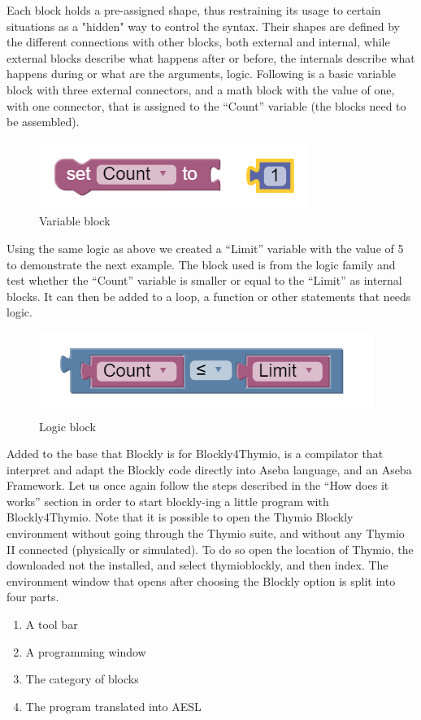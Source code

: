 \documentclass{scrartcl}
\begin{document}
Each block holds a pre-assigned shape, thus restraining its usage to certain situations as a "hidden" way to control the syntax. Their shapes are defined by the different connections with other blocks, 
both external and internal, while external blocks describe what happens after or before, the internals describe what happens during or what are the arguments, logic. 
Following is a basic variable block with three external connectors, and a math block with the value of one, with one connector, that is assigned to the “Count” variable (the blocks need to be assembled). \\
\begin{figure}[h!]
  \centering
  \includegraphics[scale=0.5]{./Blockly/basic_variable}
  \caption{Variable block}
  \label{fig:thymio_blockly_variable_block}
\end{figure}

Using the same logic as above we created a “Limit” variable with the value of 5 to demonstrate the next example. 
The block used is from the logic family and test whether the “Count” variable is smaller or equal to the “Limit” as internal blocks. 
It can then be added to a loop, a function or other statements that needs logic.\\
\begin{figure}[h!]
  \centering
  \includegraphics[scale=0.5]{./Blockly/basic_logic}
  \caption{Logic block}
  \label{fig:thymio_blockly_logic_block}
\end{figure}

Added to the base that Blockly is for Blockly4Thymio, is a compilator that interpret and adapt the Blockly code directly into Aseba language, and an Aseba Framework. 
Let us once again follow the steps described in the “How does it works” section in order to start blockly-ing a little program with Blockly4Thymio. 
Note that it is possible to open the Thymio Blockly environment without going through the Thymio suite, and without any Thymio II connected (physically or simulated). 
To do so open the location of Thymio, the downloaded not the installed, and select thymio\textunderscore blockly, and then index.
The environment window that opens after choosing the Blockly option is split into four parts.
\begin{enumerate}
  \item A tool bar
  \item A programming window
  \item The category of blocks
  \item The program translated into AESL
\end{enumerate}
\end{document}
